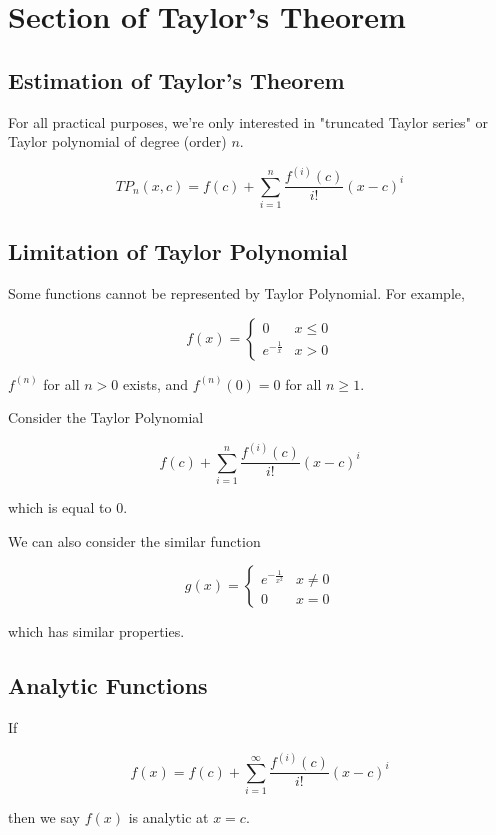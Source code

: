 \section{Section of Taylor's Theorem}

\subsection{Estimation of Taylor's Theorem}

For all practical purposes, we're only interested in "truncated Taylor series" or Taylor polynomial of degree (order) $n$.

$$ TP_n(x, c) = f(c) + \sum_{i=1}^n \frac{f^{(i)}(c)}{i!} (x - c)^i $$

\subsection{Limitation of Taylor Polynomial}

Some functions cannot be represented by Taylor Polynomial. For example,

$$ f(x) = \begin{cases}

0 & x \leq 0\\
e^{-\frac{1}{x}} & x > 0

\end{cases} $$

$f^{(n)}$ for all $n > 0$ exists, and $f^{(n)}(0) = 0$ for all $n \geq 1$.

Consider the Taylor Polynomial

$$ f(c) + \sum_{i=1}^n \frac{f^{(i)}(c)}{i!}(x - c)^i $$

which is equal to 0.

We can also consider the similar function

$$ 
  g(x) = \begin{cases}
    e^{-\frac{1}{x^2}} & x \not = 0\\
    0 & x = 0
  \end{cases}
$$

which has similar properties.

\subsection{Analytic Functions}

If 

$$ f(x) = f(c) + \sum_{i=1}^\infty \frac{f^{(i)}(c)}{i!} (x-c)^i $$

then we say $f(x)$ is analytic at $x = c$.

